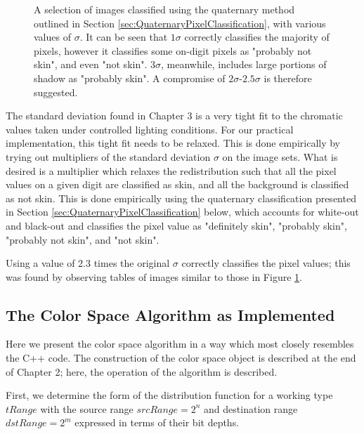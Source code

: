 {\begin{figure}[h!]
      \caption{A selection of images classified using the quaternary method outlined in Section \ref{sec:QuaternaryPixelClassification}, with various values of $\sigma$. It can be seen that $1\sigma$ correctly classifies the majority of pixels, however it classifies some on-digit pixels as "probably not skin", and even "not skin". $3\sigma$, meanwhile, includes large portions of shadow as "probably skin". A compromise of $2\sigma$-$2.5\sigma$ is therefore suggested.} \label{fig:RelaxedSigma}
  \end{figure}
  \clearpage
  }
  
  The standard deviation found in Chapter 3 is a very tight fit to the chromatic values taken under controlled lighting conditions. For our practical implementation, this tight fit needs to be relaxed. This is done empirically by trying out multipliers of the standard deviation $\sigma$ on the image sets. What is desired is a multiplier which relaxes the redistribution such that all the pixel values on a given digit are classified as skin, and all the background is classified as not skin. This is done empirically using the quaternary classification presented in Section \ref{sec:QuaternaryPixelClassification} below, which accounts for white-out and black-out and classifies the pixel value as "definitely skin", "probably skin", "probably not skin", and "not skin".
  
  Using a value of 2.3 times the original $\sigma$ correctly classifies the pixel values; this was found by observing tables of images similar to those in Figure \ref{fig:RelaxedSigma}. 
  
  
  \subsection{The Color Space Algorithm as Implemented}\label{sec:ColorSpaceAlgorithmAsImplemented}
  Here we present the color space algorithm in a way which most closely resembles the C++ code. The construction of the color space object is described at the end of Chapter 2; here, the operation of the algorithm is described.
  
  First, we determine the form of the distribution function for a working type $tRange$ with the source range $srcRange=2^n$  and destination range $dstRange=2^m$ expressed in terms of their bit depths.
  
